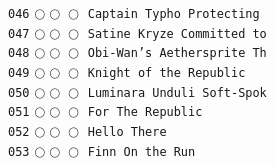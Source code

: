\documentclass[a4paper,landscape]{article}
\begin{document}
\begin{multicols*}{5}
\texttt{046} \(\bigcirc\!\bigcirc\!\bigcirc\)  \texttt{Captain Typho Protecting } \vspace{-0.3mm}\\ 
\texttt{047} \(\bigcirc\!\bigcirc\!\bigcirc\)  \texttt{Satine Kryze Committed to} \vspace{-0.3mm}\\ 
\texttt{048} \(\bigcirc\!\bigcirc\!\bigcirc\)  \texttt{Obi-Wan's Aethersprite Th} \vspace{-0.3mm}\\ 
\texttt{049} \(\bigcirc\!\bigcirc\!\bigcirc\)  \texttt{Knight of the Republic} \vspace{-0.3mm}\\ 
\texttt{050} \(\bigcirc\!\bigcirc\!\bigcirc\)  \texttt{Luminara Unduli Soft-Spok} \vspace{-0.3mm}\\ 
\texttt{051} \(\bigcirc\!\bigcirc\!\bigcirc\)  \texttt{For The Republic} \vspace{-0.3mm}\\ 
\texttt{052} \(\bigcirc\!\bigcirc\!\bigcirc\)  \texttt{Hello There} \vspace{-0.3mm}\\ 
\texttt{053} \(\bigcirc\!\bigcirc\!\bigcirc\)  \texttt{Finn On the Run} \vspace{-0.3mm}\\ 

\end{multicols*}
\end{document}
